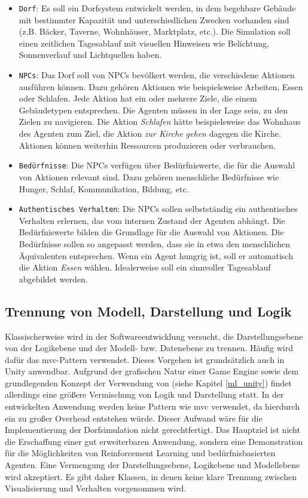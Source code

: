 \begin{itemize}
    \item \texttt{Dorf}: Es soll ein Dorfsystem entwickelt werden, in dem begehbare Gebäude mit bestimmter Kapazität und unterschiedlichen Zwecken vorhanden sind (z.B. Bäcker, Taverne, Wohnhäuser, Marktplatz, etc.). Die Simulation soll einen zeitlichen Tagesablauf mit visuellen Hinweisen wie Belichtung, Sonnenverlauf und Lichtquellen haben.
    \item \texttt{NPCs}: Das Dorf soll von NPCs bevölkert werden, die verschiedene Aktionen ausführen können. Dazu gehören Aktionen wie beispielsweise Arbeiten, Essen oder Schlafen. Jede Aktion hat ein oder mehrere Ziele, die einem Gebäudetypen entsprechen. Die Agenten müssen in der Lage sein, zu den Zielen zu navigieren. Die Aktion \textit{Schlafen} hätte beispielsweise das Wohnhaus des Agenten zum Ziel, die Aktion \textit{zur Kirche gehen} dagegen die Kirche. Aktionen können weiterhin Ressourcen produzieren oder verbrauchen.
    \item \texttt{Bedürfnisse}: Die NPCs verfügen über Bedürfniswerte, die für die Auswahl von Aktionen relevant sind. Dazu gehören menschliche Bedürfnisse wie Hunger, Schlaf, Kommunikation, Bildung, etc.
    \item \texttt{Authentisches Verhalten}: Die NPCs sollen selbstständig ein authentisches Verhalten erlernen, das vom internen Zustand der Agenten abhängt. Die Bedürfniswerte  bilden die Grundlage für die Auswahl von Aktionen. Die Bedürfnisse sollen so angepasst werden, dass sie in etwa den menschlichen Äquivalenten entsprechen. Wenn ein Agent hungrig ist, soll er automatisch die Aktion \textit{Essen} wählen. Idealerweise soll ein sinnvoller Tagesablauf abgebildet werden.
\end{itemize}



\subsection{Trennung von Modell, Darstellung und Logik}
Klassischerweise wird in der Softwareentwicklung versucht, die Darstellungsebene von der Logikebene und der Modell- bzw. Datenebene zu trennen. Häufig wird dafür das \ac{mvc}-Pattern verwendet. Dieses Vorgehen ist grundsätzlich auch in Unity anwendbar. Aufgrund der grafischen Natur einer Game Engine sowie dem grundlegenden Konzept der Verwendung von  (siehe Kapitel \ref{ml_unity}) findet allerdings eine größere Vermischung von Logik und Darstellung statt. In der entwickelten Anwendung werden keine Pattern wie \ac{mvc} verwendet, da hierdurch ein zu großer Overhead entstehen würde. Dieser Aufwand wäre für die Implementierung der Dorfsimulation nicht gerechtfertigt. Das Hauptziel ist nicht die Erschaffung einer gut erweiterbaren Anwendung, sondern eine Demonstration für die Möglichkeiten von Reinforcement Learning und bedürfnisbasierten Agenten. Eine Vermengung der Darstellungsebene, Logikebene und Modellebene wird akzeptiert. Es gibt daher Klassen, in denen keine klare Trennung zwischen Visualisierung und Verhalten vorgenommen wird.


